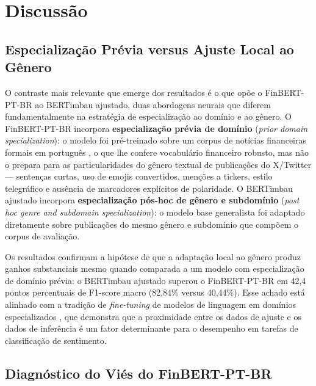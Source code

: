 
\section{Discussão}
\label{sec:discussao_resultados}

\subsection{Especialização Prévia versus Ajuste Local ao Gênero}
\label{subsec:discussao_especializacao}

O contraste mais relevante que emerge dos resultados é o que opõe o FinBERT-PT-BR ao BERTimbau ajustado, duas abordagens neurais que diferem fundamentalmente na estratégia de especialização ao domínio e ao gênero. O FinBERT-PT-BR incorpora \textbf{especialização prévia de domínio} (\textit{prior domain specialization}): o modelo foi pré-treinado sobre um corpus de notícias financeiras formais em português \cite{santos2023finbert}, o que lhe confere vocabulário financeiro robusto, mas não o prepara para as particularidades do gênero textual de publicações do X/Twitter --- sentenças curtas, uso de emojis convertidos, menções a tickers, estilo telegráfico e ausência de marcadores explícitos de polaridade. O BERTimbau ajustado incorpora \textbf{especialização pós-hoc de gênero e subdomínio} (\textit{post hoc genre and subdomain specialization}): o modelo base generalista \cite{souza2020} foi adaptado diretamente sobre publicações do mesmo gênero e subdomínio que compõem o corpus de avaliação.

Os resultados confirmam a hipótese de que a adaptação local ao gênero produz ganhos substanciais mesmo quando comparada a um modelo com especialização de domínio prévia: o BERTimbau ajustado superou o FinBERT-PT-BR em 42,4 pontos percentuais de F1-score macro (82,84\% versus 40,44\%). Esse achado está alinhado com a tradição de \textit{fine-tuning} de modelos de linguagem em domínios especializados \cite{devlin2019,santos2023finbert}, que demonstra que a proximidade entre os dados de ajuste e os dados de inferência é um fator determinante para o desempenho em tarefas de classificação de sentimento.



\subsection{Diagnóstico do Viés do FinBERT-PT-BR}
\label{subsec:discussao_vies_finbert}

